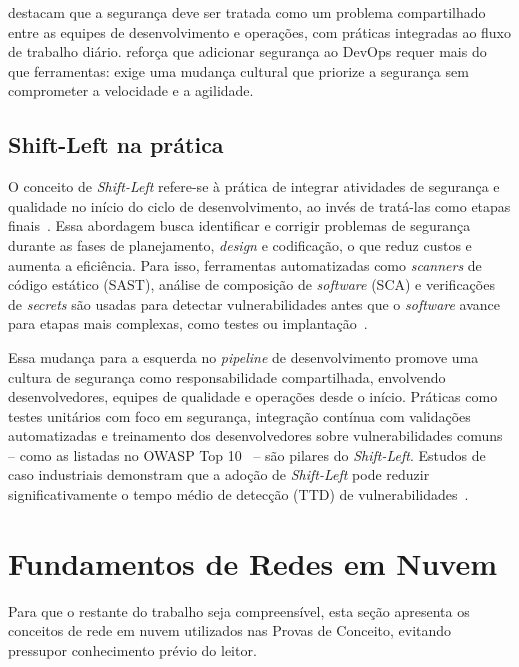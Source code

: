 destacam que a segurança deve ser tratada como um problema compartilhado entre as equipes de desenvolvimento e operações, com práticas integradas ao fluxo de trabalho diário.  reforça que adicionar segurança ao DevOps requer mais do que ferramentas: exige uma mudança cultural que priorize a segurança sem comprometer a velocidade e a agilidade.

\subsection{Shift-Left na prática}

O conceito de \textit{Shift-Left} refere-se à prática de integrar atividades de segurança e qualidade no início do ciclo de desenvolvimento, ao invés de tratá-las como etapas finais~. Essa abordagem busca identificar e corrigir problemas de segurança durante as fases de planejamento, \textit{design} e codificação, o que reduz custos e aumenta a eficiência. Para isso, ferramentas automatizadas como \textit{scanners} de código estático (SAST), análise de composição de \textit{software} (SCA) e verificações de \textit{secrets} são usadas para detectar vulnerabilidades antes que o \textit{software} avance para etapas mais complexas, como testes ou implantação~.

Essa mudança para a esquerda no \textit{pipeline} de desenvolvimento promove uma cultura de segurança como responsabilidade compartilhada, envolvendo desenvolvedores, equipes de qualidade e operações desde o início. Práticas como testes unitários com foco em segurança, integração contínua com validações automatizadas e treinamento dos desenvolvedores sobre vulnerabilidades comuns -- como as listadas no OWASP Top 10~ -- são pilares do \textit{Shift-Left}. Estudos de caso industriais demonstram que a adoção de \textit{Shift-Left} pode reduzir significativamente o tempo médio de detecção (TTD) de vulnerabilidades~.

\section{Fundamentos de Redes em Nuvem}
\label{sec:fundamentos-rede}

Para que o restante do trabalho seja compreensível, esta seção apresenta os conceitos de rede em nuvem utilizados nas Provas de Conceito, evitando pressupor conhecimento prévio do leitor.

